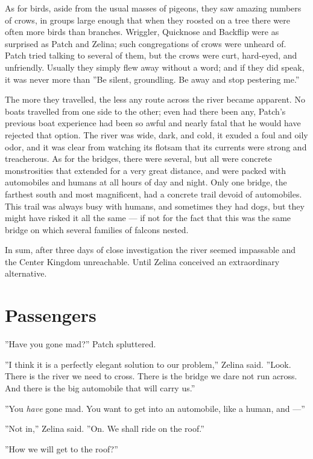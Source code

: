 \documentclass[12pt]{book}
\begin{document}
As for birds, aside from the usual masses of pigeons, they saw amazing
numbers of crows, in groups large enough that when they roosted on a
tree there were often more birds than branches. Wriggler, Quicknose
and Backflip were as surprised as Patch and Zelina; such congregations
of crows were unheard of. Patch tried talking to several of them, but
the crows were curt, hard-eyed, and unfriendly. Usually they simply
flew away without a word; and if they did speak, it was never more
than ''Be silent, groundling. Be away and stop pestering me.''

The more they travelled, the less any route across the river became
apparent. No boats travelled from one side to the other; even had
there been any, Patch's previous boat experience had been so awful and
nearly fatal that he would have rejected that option. The river was
wide, dark, and cold, it exuded a foul and oily odor, and it was clear
from watching its flotsam that its currents were strong and
treacherous. As for the bridges, there were several, but all were
concrete monstrosities that extended for a very great distance, and
were packed with automobiles and humans at all hours of day and
night. Only one bridge, the farthest south and most magnificent, had a
concrete trail devoid of automobiles. This trail was always busy with
humans, and sometimes they had dogs, but they might have risked it all
the same --- if not for the fact that this was the same bridge on
which several families of falcons nested.

In sum, after three days of close investigation the river seemed
impassable and the Center Kingdom unreachable. Until Zelina conceived
an extraordinary alternative.


\section{Passengers}

''Have you gone mad?'' Patch spluttered.

''I think it is a perfectly elegant solution to our problem,'' Zelina
said. ''Look. There is the river we need to cross. There is the bridge
we dare not run across. And there is the big automobile that will
carry us.''

''You \textit{have} gone mad. You want to get into an automobile, like
a human, and ---''

''Not in,'' Zelina said. ''On. We shall ride on the roof.''

''How we will get to the roof?''
\end{document}
